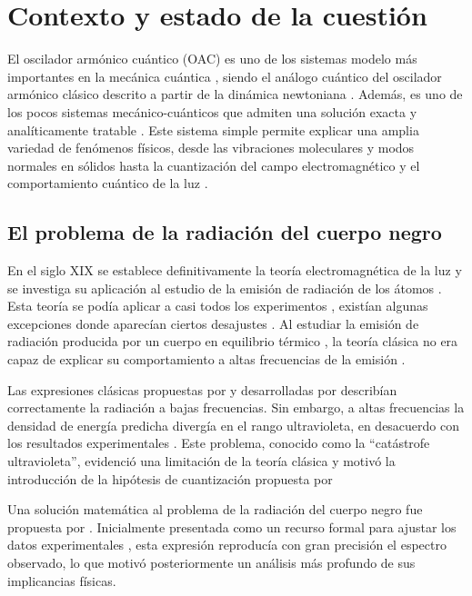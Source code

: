 \chapter{Contexto y estado de la cuestión}

El oscilador armónico cuántico (OAC) es uno de los sistemas modelo más importantes en la mecánica cuántica \citep{schrodinger1926a, bornheisenberg1926, dirac1930}, siendo el análogo cuántico del oscilador armónico clásico descrito a partir de la dinámica newtoniana \citep{newton1687}. Además, es uno de los pocos sistemas mecánico-cuánticos que admiten una solución exacta y analíticamente tratable \citep{schrodinger1926a}. Este sistema simple permite explicar una amplia variedad de fenómenos físicos, desde las vibraciones moleculares y modos normales en sólidos \citep{einstein1907,debye1912} hasta la cuantización del campo electromagnético y el comportamiento cuántico de la luz \citep{dirac1927}.

\section{El problema de la radiación del cuerpo negro}

En el siglo XIX se establece definitivamente la teoría electromagnética de la luz \citep{maxwell1865} y se investiga su aplicación al estudio de la emisión de radiación de los átomos \citep{bohr1913}. Esta teoría se podía aplicar a casi todos los experimentos \citep{rayleigh1900}, existían algunas excepciones donde aparecían ciertos desajustes \citep{jeans1905}. Al estudiar la emisión de radiación producida por un cuerpo en equilibrio térmico \citep{wien1896}, la teoría clásica no era capaz de explicar su comportamiento a altas frecuencias de la emisión \citep{rayleigh1900, jeans1905}.

Las expresiones clásicas propuestas por \cite{rayleigh1900} y desarrolladas por \cite{jeans1905} describían correctamente la radiación a bajas frecuencias. Sin embargo, a altas frecuencias la densidad de energía predicha divergía en el rango ultravioleta, en desacuerdo con los resultados experimentales \citep{wien1896}. Este problema, conocido como la ``catástrofe ultravioleta'', evidenció una limitación de la teoría clásica y motivó la introducción de la hipótesis de cuantización propuesta por \cite{planck1901}

Una solución matemática al problema de la radiación del cuerpo negro fue propuesta por \cite{planck1900, planck1901}. Inicialmente presentada como un recurso formal para ajustar los datos experimentales \citep{wien1896}, esta expresión reproducía con gran precisión el espectro observado, lo que motivó posteriormente un análisis más profundo de sus implicancias físicas.

